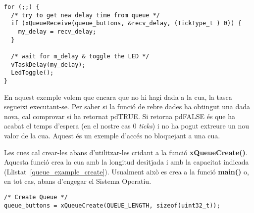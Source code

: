 \begin{lstlisting}[style=customc,label=queue_example_main, caption=Part principal de la tasca TaskLedToggle]
for (;;) {
  /* try to get new delay time from queue */
  if (xQueueReceive(queue_buttons, &recv_delay, (TickType_t ) 0)) {
    my_delay = recv_delay;
  }

  /* wait for m_delay & toggle the LED */
  vTaskDelay(my_delay);
  LedToggle();
}
\end{lstlisting}

En aquest exemple volem que encara que no hi hagi dada a la cua, la tasca segueixi executant-se. Per saber si la funció de rebre dades ha obtingut una dada nova, cal comprovar si ha retornat \gls{pdTRUE}. Si retorna \gls{pdFALSE} és que ha acabat el temps d'espera (en el nostre cas 0 {\em ticks}) i no ha pogut extreure un nou valor de la cua. Aquest és un exemple d'accés no bloquejant a una cua.

Les cues cal crear-les abans d'utilitzar-les cridant a la funció {\bf xQueueCreate()}. Aquesta funció crea la cua amb la longitud desitjada i amb la capacitat indicada (Llistat~\ref{queue_example_create}).
Usualment això es crea a la funció {\bf main()} o, en tot cas, abans d'engegar el Sistema Operatiu.

\begin{lstlisting}[style=customc, label=queue_example_create, caption=Creació d'una cua]
/* Create Queue */
queue_buttons = xQueueCreate(QUEUE_LENGTH, sizeof(uint32_t));
\end{lstlisting}

%
%
%

